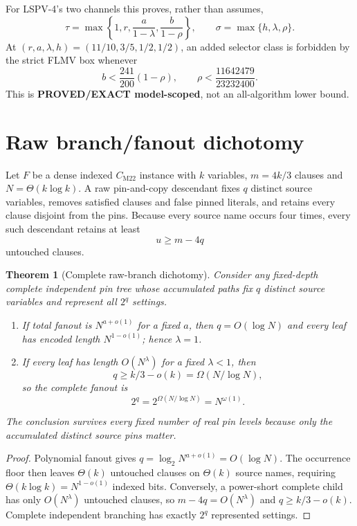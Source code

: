 \documentclass[11pt]{article}
\newtheorem{theorem}{Theorem}
\begin{document}
For LSPV-4's two channels this proves, rather than assumes,
\[
 \tau=\max\left\{1,r,\frac{a}{1-\lambda},
                  \frac{b}{1-\rho}\right\},\qquad
 \sigma=\max\{h,\lambda,\rho\}.
\]
At $(r,a,\lambda,h)=(11/10,3/5,1/2,1/2)$, an added selector class is forbidden
by the strict FLMV box whenever
\[
 b<\frac{241}{200}(1-\rho),\qquad
 \rho<\frac{11642479}{23232400}.
\]
This is \textbf{PROVED/EXACT model-scoped}, not an all-algorithm lower bound.

\section{Raw branch/fanout dichotomy}
Let $F$ be a dense indexed $C_{\mathrm{M22}}$ instance with $k$ variables,
$m=4k/3$ clauses and $N=\Theta(k\log k)$.  A raw pin-and-copy descendant fixes
$q$ distinct source variables, removes satisfied clauses and false pinned
literals, and retains every clause disjoint from the pins.  Because every source
name occurs four times, every such descendant retains at least
\[
 u\ge m-4q
\]
untouched clauses.

\begin{theorem}[Complete raw-branch dichotomy]
Consider any fixed-depth complete independent pin tree whose accumulated paths
fix $q$ distinct source variables and represent all $2^q$ settings.
\begin{enumerate}
\item If total fanout is $N^{a+o(1)}$ for a fixed $a$, then
$q=O(\log N)$ and every leaf has encoded length $N^{1-o(1)}$; hence
$\lambda=1$.
\item If every leaf has length $O(N^\lambda)$ for a fixed $\lambda<1$, then
\[
 q\ge k/3-o(k)=\Omega(N/\log N),
\]
so the complete fanout is
\[
 2^q=2^{\Omega(N/\log N)}=N^{\omega(1)}.
\]
\end{enumerate}
The conclusion survives every fixed number of real pin levels because only the
accumulated distinct source pins matter.
\end{theorem}
\begin{proof}
Polynomial fanout gives $q=\log_2 N^{a+o(1)}=O(\log N)$.  The occurrence floor
then leaves $\Theta(k)$ untouched clauses on $\Theta(k)$ source names, requiring
$\Theta(k\log k)=N^{1-o(1)}$ indexed bits.  Conversely, a power-short complete
child has only $O(N^\lambda)$ untouched clauses, so
$m-4q=O(N^\lambda)$ and $q\ge k/3-o(k)$.  Complete independent branching has
exactly $2^q$ represented settings.
\end{proof}
\end{document}
